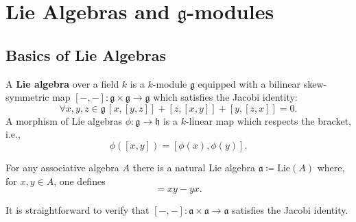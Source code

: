 \section{Lie Algebras and $ \mathfrak{g} $-modules} %
\label{chap:Lie Algebras and Lie Algebra Modules}

\subsection{Basics of Lie Algebras} %
\label{sec:Basics of Lie Algebras}
\begin{definition}
  A \textbf{Lie algebra} over a field $ k $ is a $ k $-module $ \mathfrak{g} $ equipped with a bilinear skew-symmetric map $ [-,-]: \mathfrak{g} \times \mathfrak{g} \to \mathfrak{g} $ which satisfies the Jacobi identity:
  \begin{equation}
    \forall x,y,z \in \mathfrak{g}\, [x,[y,z]] + [z, [x, y]] + [y, [z, x]] = 0
    \label{eq:jacobi}
  .\end{equation}
  A morphism of Lie algebras $ \phi: \mathfrak{g} \to \mathfrak{h} $ is a $ k $-linear map which respects the bracket, i.e.,
  \begin{equation}
    \phi([x,y]) = [\phi(x), \phi(y)].
    \label{eq:liehom}
  \end{equation}
\end{definition}

For any associative algebra $ A $ there is a natural Lie algebra $ \mathfrak{a}\coloneqq \text{Lie}(A) $ where, for $ x,y \in A $, one defines
\begin{equation*}
  [x,y] = xy - yx
.\end{equation*}

It is straightforward to verify that $ [-,-]: \mathfrak{a} \times \mathfrak{a} \to \mathfrak{a} $ satisfies the Jacobi identity.

